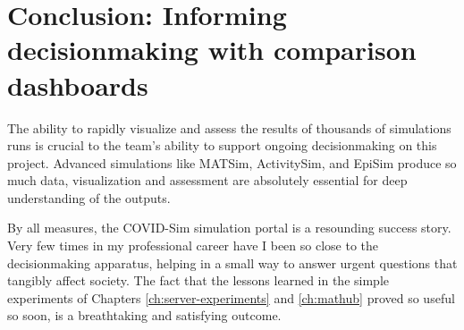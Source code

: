 \hypertarget{covid-informing-decisionmaking-with-comparison-dashboards}{%
\section{Conclusion: Informing decisionmaking with comparison dashboards}\label{covid-informing-decisionmaking}}

The ability to rapidly visualize and assess the results of thousands of simulations runs is crucial to the team's ability to support ongoing decisionmaking on this project. Advanced simulations like MATSim, ActivitySim, and EpiSim produce so much data, visualization and assessment are absolutely essential for deep understanding of the outputs.

By all measures, the COVID-Sim simulation portal is a resounding success story. Very few times in my professional career have I been so close to the decisionmaking apparatus, helping in a small way to answer urgent questions that tangibly affect society. The fact that the lessons learned in the simple experiments of Chapters \ref{ch:server-experiments} and \ref{ch:mathub} proved so useful so soon, is a breathtaking and satisfying outcome.
